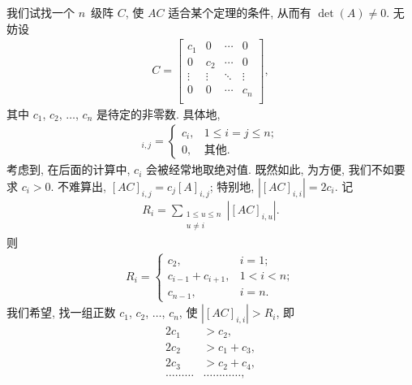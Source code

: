 \begin{example}
    我们试找一个 \(n\)~级阵 \(C\),
    使 \(AC\) 适合某个定理的条件,
    从而有 \(\det {(A)} \neq 0\).
    无妨设
    \begin{align*}
        C =
        \begin{bmatrix}
            c_1    & 0      & \cdots & 0      \\
            0      & c_2    & \cdots & 0      \\
            \vdots & \vdots & \ddots & \vdots \\
            0      & 0      & \cdots & c_n    \\
        \end{bmatrix},
    \end{align*}
    其中 \(c_1\), \(c_2\), \(\dots\), \(c_n\) 是待定的非零数.
    具体地,
    \begin{align*}
        [C]_{i,j}
        = \begin{cases}
              c_i, & 1 \leq i = j \leq n; \\
              0,   & \text{其他}.
          \end{cases}
    \end{align*}
    考虑到, 在后面的计算中, \(c_i\) 会被经常地取绝对值.
    既然如此, 为方便, 我们不如要求 \(c_i > 0\).
    不难算出, \([AC]_{i,j} = c_j [A]_{i,j}\);
    特别地, \(|[AC]_{i,i}| = 2c_i\).
    记
    \begin{align*}
        R_i = \sum_{\substack{1 \leq u \leq n \\ u \neq i}}
        {|[AC]_{i,u}|}.
    \end{align*}
    则
    \begin{align*}
        R_i =
        \begin{cases}
            c_2,               & i = 1;     \\
            c_{i-1} + c_{i+1}, & 1 < i < n; \\
            c_{n-1},           & i = n.
        \end{cases}
    \end{align*}
    我们希望, 找一组正数 \(c_1\), \(c_2\), \(\dots\), \(c_n\),
    使 \(|[AC]_{i,i}| > R_i\), 即
    \begin{align*}
        2c_1     & > c_2,           \\
        2c_2     & > c_1 + c_3,     \\
        2c_3     & > c_2 + c_4,     \\
        \dots \dots \dots
                 &
        \dots \dots \dots \dots,    \\

\end{align*}
\end{example}

